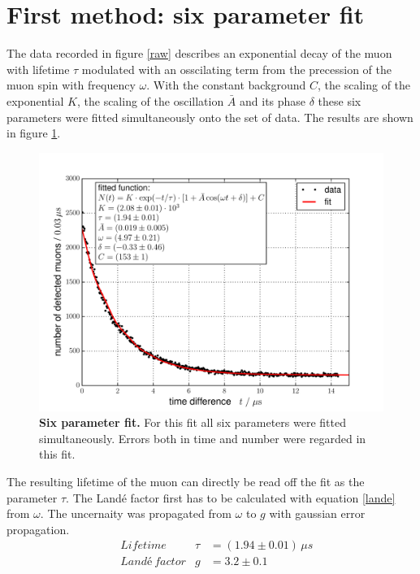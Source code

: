 \documentclass{include/thesisclass3}
\newcommand{\e}[1]{\,\si{#1}}
\begin{document}
\section{First method: six parameter fit}
\label{first}
The data recorded in figure \ref{raw} describes an exponential decay of the muon with lifetime $\tau$ modulated with an osscilating term from the precession of the muon spin with frequency $\omega$. 
With the constant background $C$, the scaling of the exponential $K$, the scaling of the oscillation $\bar A$ and its phase $\delta$ these six parameters were fitted simultaneously onto the set of data. The results are shown in figure \ref{6pm}.
\begin{figure}[H]
\centering
\includegraphics[width= 0.8 \textwidth]{images/6paramfit.pdf}
\caption{\label{6pm}\textbf{Six parameter fit.} For this fit all six parameters were fitted simultaneously. Errors both in time and number were regarded in this fit.}
\end{figure}
The resulting lifetime of the muon can directly be read off the fit as the parameter $\tau$. 
The Landé factor first has to be calculated with equation \ref{lande} from $\omega$.
The uncernaity was propagated from $\omega$ to $g$ with gaussian error propagation.
\begin{align}
&\e{Lifetime} &\tau &=(1.94\pm 0.01)\e{\mu s}\\
&\e{Landé~factor} &g &=3.2 \pm 0.1
\end{align}
\end{document}
